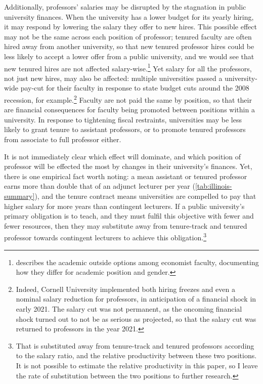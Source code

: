 Additionally, professors' salaries may be disrupted by the stagnation in public university finances.
When the university has a lower budget for its yearly hiring, it may respond by lowering the salary they offer to new hires.
This possible effect may not be the same across each position of professor; tenured faculty are often hired away from another university, so that new tenured professor hires could be less likely to accept a lower offer from a public university, and we would see that new tenured hires are not affected salary-wise.\footnote{
    \cite{blackaby2005} describes the academic outside options among economist faculty, documenting how they differ for academic position and gender.
}
Yet salary for all the professors, not just new hires, may also be affected: multiple universities passed a university-wide pay-cut for their faculty in response to state budget cuts around the 2008 recession, for example.\footnote{
    Indeed, Cornell University implemented both hiring freezes and even a nominal salary reduction for professors, in anticipation of a financial shock in early 2021.
    The salary cut was not permanent, as the oncoming financial shock turned out to not be as serious as projected, so that the salary cut was returned to professors in the year 2021.
}
Faculty are not paid the same by position, so that their are financial consequences for faculty being promoted between positions within a university.
In response to tightening fiscal restraints, universities may be less likely to grant tenure to assistant professors, or to promote tenured professors from associate to full professor either.

It is not immediately clear which effect will dominate, and which position of professor will be effected the most by changes in their university's finances.
Yet, there is one empirical fact worth noting: a mean assistant or tenured professor earns more than double that of an adjunct lecturer per year (\autoref{tab:illinois-summary}), and the tenure contract means universities are compelled to pay that higher salary for more years than contingent lecturers.
If a public university's primary obligation is to teach, and they must fulfil this objective with fewer and fewer resources, then they may substitute away from tenure-track and tenured professor towards contingent lecturers to achieve this obligation.\footnote{
    That is substituted away from tenure-track and tenured professors according to the salary ratio, and the relative productivity between these two positions.
    It is not possible to estimate the relative productivity in this paper, so I leave the rate of substitution between the two positions to further research.
}
